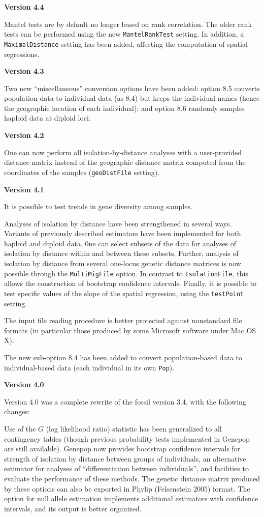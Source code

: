 \documentclass[12pt,]{book}
\begin{document}
\textbf{Version 4.4}

Mantel tests are by default no longer based on rank correlation. The
older rank tests can be performed using the new \texttt{MantelRankTest}
setting. In addition, a \texttt{MaximalDistance} setting has been added,
affecting the computation of spatial regressions.

\textbf{Version 4.3}

Two new ``miscellaneous'' conversion options have been added: option 8.5
converts population data to individual data (as 8.4) but keeps the
individual names (hence the geographic location of each individual); and
option 8.6 randomly samples haploid data at diploid loci.

\textbf{Version 4.2}

One can now perform all isolation-by-distance analyses with a
user-provided distance matrix instead of the geographic distance matrix
computed from the coordinates of the samples (\texttt{geoDistFile}
setting).

\textbf{Version 4.1}

It is possible to test trends in gene diversity among samples.

Analyses of isolation by distance have been strengthened in several
ways. Variants of previously described estimators have been implemented
for both haploid and diploid data. 0ne can select subsets of the data
for analyses of isolation by distance within and between these subsets.
Further, analysis of isolation by distance from several one-locus
genetic distance matrices is now possible through the
\texttt{MultiMigFile} option. In contrast to \texttt{IsolationFile},
this allows the construction of bootstrap confidence intervals. Finally,
it is possible to test specific values of the slope of the spatial
regression, using the \texttt{testPoint} setting.

The input file reading procedure is better protected against nonstandard
file formats (in particular those produced by some Microsoft software
under Mac OS X).

The new sub-option 8.4 has been added to convert population-based data
to individual-based data (each individual in its own \texttt{Pop}).

\textbf{Version 4.0}

Version 4.0 was a complete rewrite of the fossil version 3.4, with the
following changes:

Use of the \(G\) (log likelihood ratio) statistic has been generalized
to all contingency tables (though previous probability tests implemented
in Genepop are still available). Genepop now provides bootstrap
confidence intervals for strength of isolation by distance between
groups of individuals, an alternative estimator for analyses of
``differentiation between individuals'', and facilities to evaluate the
performance of these methods. The genetic distance matrix produced by
these options can also be exported in Phylip (Felsenstein 2005) format.
The option for null allele estimation implements additional estimators
with confidence intervals, and its output is better organized.
\end{document}
